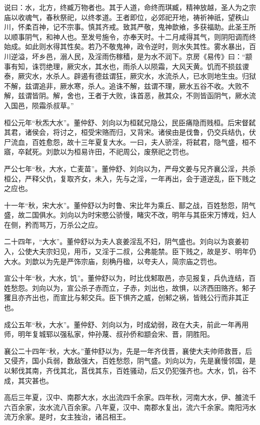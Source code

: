 \documentclass[]{article}
\begin{document}
说曰：水，北方，终臧万物者也。其于人道，命终而琪臧，精神放越，圣人为之宗庙以收魂气，春秋祭祀，以终孝道。王者即位，必郊祀开地，祷祈神祇，望秩山川，怀柔百神，记不宗事。慎其齐戒。致其严敬，鬼神歆飨，多获福助。此圣王所以顺事阴气，和神人也。至发号施令，亦奉天时。十二月咸得其气，则阴阳调而终始成。如此则水得其性矣。若乃不敬鬼神，政令逆时，则水失其性。雾水暴出，百川逆溢，坏乡邑，溺人民，及淫雨伤稼穑，是为水不润下。京房《易传》曰：``颛事有知，诛罚绝理，厥灾水，其水也，雨杀人以陨霜，大风天黄。饥而不损兹谡泰，厥灾水，水杀人。辟遏有德兹谓狂，厥灾水，水流杀人，已水则地生虫。归狱不解，兹谓追非，厥水寒，杀人。追诛不解，兹谓不理，厥水五谷不收。大败不解，兹谓皆阴。解，舍也，王者于大败，诛首恶，赦其众，不则皆函阴气，厥水流入国邑，陨霜杀叔草。''

桓公元年``秋炁大水''。董仲舒、刘向以为桓弑兄隐公，民臣痛隐而贱桓。后宋督弑其君，诸侯会，将讨之，桓受宋赂而归，又背宋。诸侯由是伐鲁，仍交兵结仇，伏尸流血，百姓愈怨，故十三年夏复大水。一曰，夫人骄淫，将弑君，隐气盛，桓不寤，卒弑死。刘歆以为桓易许田，不祀周公，废祭祀之罚也。

严公七年``秋，大水，亡麦苗''。董仲舒、刘向以为，严母文姜与兄齐襄公淫，共杀桓公，严释父仇，复取齐女，未入，先与之淫，一年再出，会于道逆乱，臣下贱之之应也。

十一年``秋，宋大水''。董仲舒以为时鲁、宋比年为乘丘、鄑之战，百姓愁怨，阴气盛，故二国俱水。刘向以为时宋愍公骄慢，睹灾不改，明年与其臣宋万博戏，妇人在侧，矜而骂万，万杀公之应。

二十四年，``大水''。董仲舒以为夫人哀姜淫乱不妇，阴气盛也。刘向以为哀姜初入，公使大夫宗妇见，用币，又淫于二叔，公弗能禁。臣下贱之，故是岁、明年仍大水。刘歆以为先是严饰宗庙，刻桷丹楹，以夸夫人，简宗庙之罚也。

宣公十年``秋，大水，饥''。董仲舒以为，时比伐邾取邑，亦见报复，兵仇连结，百姓愁怨。刘向以为，宣公杀子赤而立，子赤，刘出也，故惧，以济西田赂齐。邾子玃且亦齐出也，而宣比与邾交兵。臣下惧齐之威，创邾之祸，皆贱公行而非其正也。

成公五年``秋，大水''。董仲舒、刘向以为，时成幼弱，政在大夫，前此一年再用师，明年复城郓以强私家，仲孙蔑、叔孙侨和颛会宋、晋，阴胜阳。

襄公二十四年``秋，大水。''董仲舒以为，先是一年齐伐晋，襄使大夫帅师救晋，后又侵齐，国小兵弱，数敌强大，百姓愁怨，阴气盛。刘向以为，先是襄慢邻国，是以邾伐其南，齐伐其北，莒伐其东，百姓骚动，后又仍犯强齐也。大水，饥，谷不成，其灾甚也。

高后三年夏，汉中、南郡大水，水出流四千余家。四年秋，河南大水，伊、雒流千六百余家，汝水流八百余家。八年夏，汉中、南郡水复出，流六千余家。南阳沔水流万余家。是时，女主独治，诸吕相王。
\end{document}
